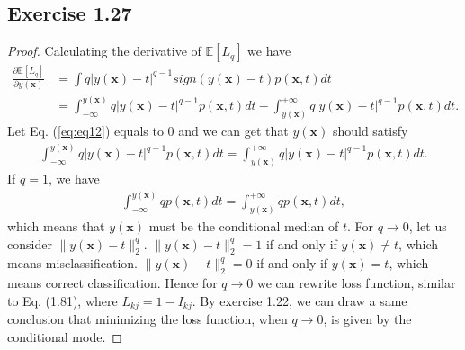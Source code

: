 \documentclass[11pt]{article}
\theoremstyle{definition}
\newcommand{\E}{\mathbb{E}}
\begin{document}
\subsection{Exercise 1.27}
\begin{proof}
Calculating the derivative of $\E[L_q]$ we have
\begin{align}
\frac{\partial \E[L_q]}{\partial y(\textbf{x})} &= \int q|y(\textbf{x})-t|^{q-1}sign(y(\textbf{x})-t)p(\textbf{x}, t)dt \nonumber\\
&= \int_{-\infty}^{y(\textbf{x})} q|y(\textbf{x})-t|^{q-1}p(\textbf{x}, t)dt - \int_{y(\textbf{x})}^{+\infty} q|y(\textbf{x})-t|^{q-1}p(\textbf{x}, t)dt. \label{eq:eq12}
\end{align}
Let Eq. (\ref{eq:eq12}) equals to 0 and we can get that $y(\textbf{x})$ should satisfy
\begin{align*}
\int_{-\infty}^{y(\textbf{x})} q|y(\textbf{x})-t|^{q-1}p(\textbf{x}, t)dt = \int_{y(\textbf{x})}^{+\infty} q|y(\textbf{x})-t|^{q-1}p(\textbf{x}, t)dt.
\end{align*}
If $q = 1$, we have
\begin{align*}
\int_{-\infty}^{y(\textbf{x})} qp(\textbf{x}, t)dt = \int_{y(\textbf{x})}^{+\infty} qp(\textbf{x}, t)dt,
\end{align*}
which means that $y(\textbf{x})$ must be the conditional median of $t$. For $q \rightarrow 0$, let us consider $\lVert y(\textbf{x})-t\rVert^q_2$. $\lVert y(\textbf{x})-t\rVert^q_2 = 1$ if and only if $y(\textbf{x}) \not= t$, which means misclassification. $\lVert y(\textbf{x})-t\rVert^q_2 = 0$ if and only if $y(\textbf{x}) = t$, which means correct classification. Hence for $q \rightarrow 0$ we can rewrite loss function, similar to Eq. (1.81), where $L_{kj} = 1 - I_{kj}$. By exercise 1.22, we can draw a same conclusion that minimizing the loss function, when $q \rightarrow 0$, is given by the conditional mode. 
\end{proof}
\end{document}
